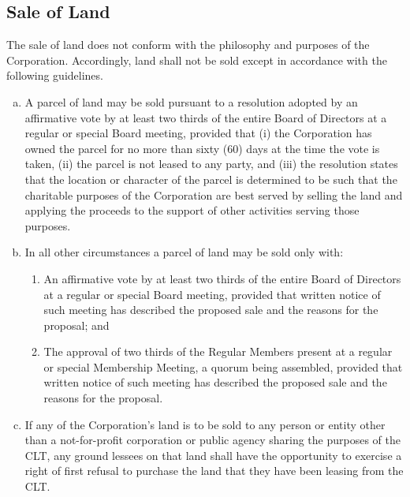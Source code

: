 \subsection{Sale of Land}
The sale of land does not conform with the philosophy and purposes of
the Corporation. Accordingly, land shall not be sold except in
accordance with the following guidelines.
\begin{enumerate}[a.]
\item A parcel of land may be sold pursuant to a resolution adopted by
  an affirmative vote by at least two thirds of the entire Board of
  Directors at a regular or special Board meeting, provided that (i)
  the Corporation has owned the parcel for no more than sixty (60)
  days at the time the vote is taken, (ii) the parcel is not leased to
  any party, and (iii) the resolution states that the location or
  character of the parcel is determined to be such that the charitable
  purposes of the Corporation are best served by selling the land and
  applying the proceeds to the support of other activities serving
  those purposes.
\item In all other circumstances a parcel of land may be sold only with:
  \begin{enumerate}[(1)]
    \item An affirmative vote by at least two thirds of the entire
      Board of Directors at a regular or special Board meeting,
      provided that written notice of such meeting has described the
      proposed sale and the reasons for the proposal; and
    \item The approval of two thirds of the Regular Members present at
      a regular or special Membership Meeting, a quorum being
      assembled, provided that written notice of such meeting has
      described the proposed sale and the reasons for the proposal.
  \end{enumerate}
  \item If any of the Corporation’s land is to be sold to any person
    or entity other than a not-for-profit corporation or public agency
    sharing the purposes of the CLT, any ground lessees on that land
    shall have the opportunity to exercise a right of first refusal to
    purchase the land that they have been leasing from the CLT.
\end{enumerate}


